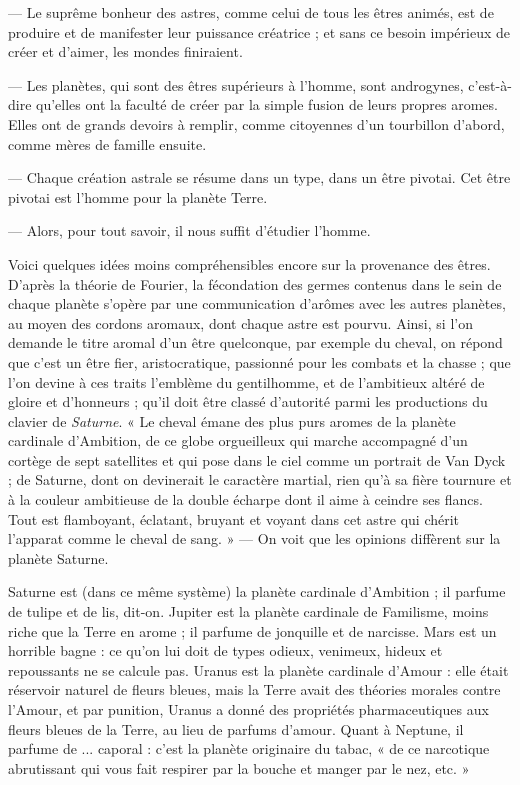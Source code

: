\documentclass[a4paper, 11pt, oneside]{article}
\begin{document}
--- Le suprême bonheur des astres, comme celui de tous les êtres animés, est de produire et de manifester leur puissance créatrice ; et sans ce besoin impérieux de créer et d'aimer, les mondes finiraient.

--- Les planètes, qui sont des êtres supérieurs à l'homme, sont androgynes, c'est-à-dire qu'elles ont la faculté de créer par la simple fusion de leurs propres aromes. Elles ont de grands devoirs à remplir, comme citoyennes d'un tourbillon d'abord, comme mères de famille ensuite.

--- Chaque création astrale se résume dans un type, dans un être pivotai. Cet être pivotai est l'homme pour la planète Terre.

--- Alors, pour tout savoir, il nous suffit d'étudier l'homme.

Voici quelques idées moins compréhensibles encore sur la provenance des êtres. D'après la théorie de Fourier, la fécondation des germes contenus dans le sein de chaque planète s'opère par une communication d'arômes avec les autres planètes, au moyen des cordons aromaux, dont chaque astre est pourvu. Ainsi, si l'on demande le titre aromal d'un être quelconque, par exemple du cheval, on répond que c'est un être fier, aristocratique, passionné pour les combats et la chasse ; que l'on devine à ces traits l'emblème du gentilhomme, et de l'ambitieux altéré de gloire et d'honneurs ; qu'il doit être classé d'autorité parmi les productions du clavier de \emph{Saturne}. « Le cheval émane des plus purs aromes de la planète cardinale d'Ambition, de ce globe orgueilleux qui marche accompagné d'un cortège de sept satellites et qui pose dans le ciel comme un portrait de Van Dyck ; de Saturne, dont on devinerait le caractère martial, rien qu'à sa fière tournure et à la couleur ambitieuse de la double écharpe dont il aime à ceindre ses flancs. Tout est flamboyant, éclatant, bruyant et voyant dans cet astre qui chérit l'apparat comme le cheval de sang. » --- On voit que les opinions diffèrent sur la planète Saturne.

Saturne est (dans ce même système) la planète cardinale d'Ambition ; il parfume de tulipe et de lis, dit-on. Jupiter est la planète cardinale de Familisme, moins riche que la Terre en arome ; il parfume de jonquille et de narcisse. Mars est un horrible bagne : ce qu'on lui doit de types odieux, venimeux, hideux et repoussants ne se calcule pas. Uranus est la planète cardinale d'Amour : elle était réservoir naturel de fleurs bleues, mais la Terre avait des théories morales contre l'Amour, et par punition, Uranus a donné des propriétés pharmaceutiques aux fleurs bleues de la Terre, au lieu de parfums d'amour. Quant à Neptune, il parfume de ... caporal : c'est la planète originaire du tabac, « de ce narcotique abrutissant qui vous fait respirer par la bouche et manger par le nez, etc. »
\end{document}
